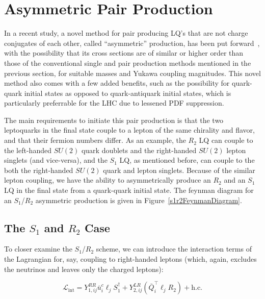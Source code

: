 \section{Asymmetric Pair Production}
    In a recent study, a novel method for pair producing LQ's that are not charge conjugates of each other, called ``asymmetric'' production, has been put forward~\cite{Dorsner_2023}, with the possibility that its cross sections are of similar or higher order than those of the conventional single and pair production methods mentioned in the previous section, for suitable masses and Yukawa coupling magnitudes. This novel method also comes with a few added benefits, such as the possibility for quark-quark initial states as opposed to quark-antiquark initial states, which is particularly preferrable for the LHC due to lessened PDF suppression.

    The main requirements to initiate this pair production is that the two leptoquarks in the final state couple to a lepton of the same chirality and flavor, and that their fermion numbers differ. As an example, the $R_2$ LQ can couple to the left-handed $SU(2)$ quark doublets and the right-handed $SU(2)$ lepton singlets (and vice-versa), and the $S_1$ LQ, as mentioned before, can couple to the both the right-handed $SU(2)$ quark and lepton singlets. Because of the similar lepton coupling, we have the ability to asymmetrically produce an $R_2$ and an $S_1$ LQ in the final state from a quark-quark initial state. The feynman diagram for an $S_1$/$R_2$ asymmetric production is given in Figure~\ref{s1r2FeynmanDiagram}.

    

    \subsection{The \texorpdfstring{$S_1$ and $R_2$}{S1 and R2} Case}

        To closer examine the $S_1$/$R_2$ scheme, we can introduce the interaction terms of the Lagrangian for, say, coupling to right-handed leptons (which, again, excludes the neutrinos and leaves only the charged leptons):

        \begin{equation}
            \mathcal{L}_{\text{int}} = Y_{1,ij}^{RR} \bar{u}_i^c \ell_j S_1^{\dagger} + Y_{2,ij}^{LR} \left(\bar{Q}_i^{\intercal} \ell_j R_2\right) + \text{h.c.}
        \end{equation}

